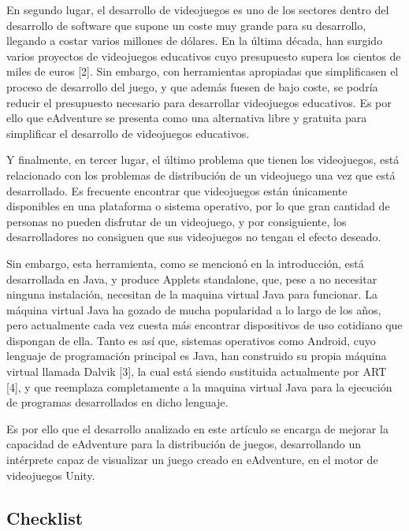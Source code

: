 En segundo lugar, el desarrollo de videojuegos es uno de los sectores dentro del desarrollo de software que supone un coste muy grande para su desarrollo, llegando a costar varios millones de dólares. En la última década, han surgido varios proyectos de videojuegos educativos cuyo presupuesto supera los cientos de miles de euros [2]. Sin embargo, con herramientas apropiadas que simplificasen el proceso de desarrollo del juego, y que además fuesen de bajo coste, se podría reducir el presupuesto necesario para desarrollar videojuegos educativos. Es por ello que eAdventure se presenta como una alternativa libre y gratuita para simplificar el desarrollo de videojuegos educativos. 

Y finalmente, en tercer lugar, el último problema que tienen los videojuegos, está relacionado con los problemas de distribución de un videojuego una vez que está desarrollado. Es frecuente encontrar que videojuegos están únicamente
disponibles en una plataforma o sistema operativo, por lo que gran cantidad de personas no pueden disfrutar de un videojuego, y por consiguiente, los desarrolladores no consiguen que sus videojuegos no tengan el efecto deseado.

Sin embargo, esta herramienta, como se mencionó en la introducción, está desarrollada en Java, y produce Applets standalone, que, pese a no necesitar ninguna instalación, necesitan de la maquina virtual Java para funcionar. La máquina virtual Java ha gozado de mucha popularidad a lo largo de los años, pero actualmente cada vez cuesta más encontrar dispositivos de uso cotidiano que dispongan de ella. Tanto es así que, sistemas operativos como Android, cuyo lenguaje de programación principal es Java, han construido su propia máquina virtual llamada Dalvik [3], la cual está siendo sustituida actualmente por ART [4], y que reemplaza completamente a la maquina virtual Java para la ejecución de programas desarrollados en dicho lenguaje.

Es por ello que el desarrollo analizado en este artículo se encarga de mejorar la capacidad de eAdventure para la distribución de juegos, desarrollando un intérprete capaz de visualizar un juego creado en eAdventure, en el motor de videojuegos Unity. 


\subsection{Checklist}
\label{checklist}

